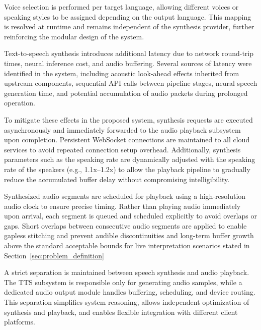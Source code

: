 Voice selection is performed per target language, allowing different voices or speaking styles to be assigned depending on the output language. This mapping is resolved at runtime and remains independent of the synthesis provider, further reinforcing the modular design of the system.

Text-to-speech synthesis introduces additional latency due to network round-trip times, neural inference cost, and audio buffering. Several sources of latency were identified in the system, including acoustic look-ahead effects inherited from upstream components, sequential API calls between pipeline stages, neural speech generation time, and potential accumulation of audio packets during prolonged operation.

To mitigate these effects in the proposed system, synthesis requests are executed asynchronously and immediately forwarded to the audio playback subsystem upon completion. Persistent WebSocket connections are maintained to all cloud services to avoid repeated connection setup overhead. Additionally, synthesis parameters such as the speaking rate are dynamically adjusted with the speaking rate of the speakers (e.g., 1.1x–1.2x) to allow the playback pipeline to gradually reduce the accumulated buffer delay without compromising intelligibility.

Synthesized audio segments are scheduled for playback using a high-resolution audio clock to ensure precise timing. Rather than playing audio immediately upon arrival, each segment is queued and scheduled explicitly to avoid overlaps or gaps. Short overlaps between consecutive audio segments are applied to enable gapless stitching and prevent audible discontinuities and long-term buffer growth above the standard acceptable bounds for live interpretation scenarios stated in Section~\ref{sec:problem_definition}

A strict separation is maintained between speech synthesis and audio playback. The TTS subsystem is responsible only for generating audio samples, while a dedicated audio output module handles buffering, scheduling, and device routing. This separation simplifies system reasoning, allows independent optimization of synthesis and playback, and enables flexible integration with different client platforms.


